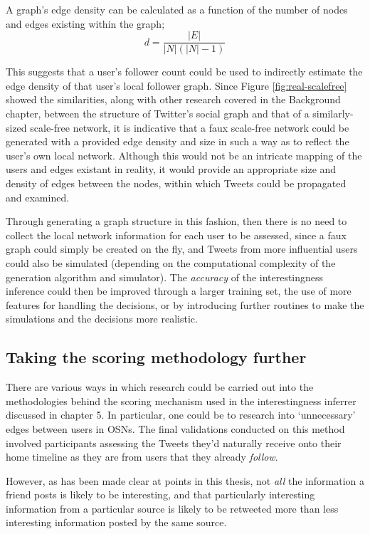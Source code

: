 A graph's edge density can be calculated as a function of the number of nodes and edges existing within the graph;
\[
    d = \frac{|E|}{|N|(|N| - 1)}
\]

This suggests that a user's follower count could be used to indirectly estimate the edge density of that user's local follower graph. Since Figure \ref{fig:real-scalefree} showed the similarities, along with other research covered in the Background chapter, between the structure of Twitter's social graph and that of a similarly-sized scale-free network, it is indicative that a faux scale-free network could be generated with a provided edge density and size in such a way as to reflect the user's own local network. Although this would not be an intricate mapping of the users and edges existant in reality, it would provide an appropriate size and density of edges between the nodes, within which Tweets could be propagated and examined.

Through generating a graph structure in this fashion, then there is no need to collect the local network information for each user to be assessed, since a faux graph could simply be created on the fly, and Tweets from more influential users could also be simulated (depending on the computational complexity of the generation algorithm and simulator). The \textit{accuracy} of the interestingness inference could then be improved through a larger training set, the use of more features for handling the decisions, or by introducing further routines to make the simulations and the decisions more realistic. 


\subsection{Taking the scoring methodology further}
There are various ways in which research could be carried out into the methodologies behind the scoring mechanism used in the interestingness inferrer discussed in chapter 5. In particular, one could be to research into `unnecessary' edges between users in OSNs. The final validations conducted on this method involved participants assessing the Tweets they'd naturally receive onto their home timeline as they are from users that they already \textit{follow}. 

However, as has been made clear at points in this thesis, not \textit{all} the information a friend posts is likely to be interesting, and that particularly interesting information from a particular source is likely to be retweeted more than less interesting information posted by the same source. 

